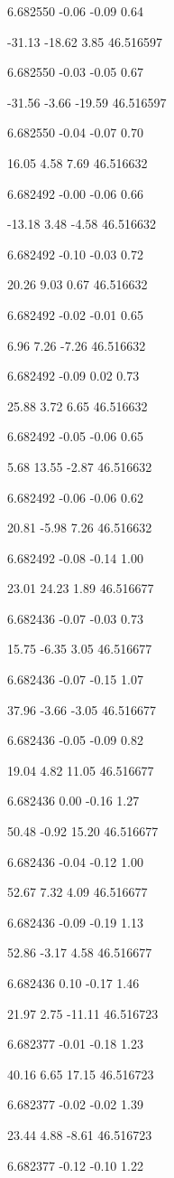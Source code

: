 6.682550
-0.06
-0.09
0.64

-31.13
-18.62
3.85
46.516597

6.682550
-0.03
-0.05
0.67

-31.56
-3.66
-19.59
46.516597

6.682550
-0.04
-0.07
0.70

16.05
4.58
7.69
46.516632

6.682492
-0.00
-0.06
0.66

-13.18
3.48
-4.58
46.516632

6.682492
-0.10
-0.03
0.72

20.26
9.03
0.67
46.516632

6.682492
-0.02
-0.01
0.65

6.96
7.26
-7.26
46.516632

6.682492
-0.09
0.02
0.73

25.88
3.72
6.65
46.516632

6.682492
-0.05
-0.06
0.65

5.68
13.55
-2.87
46.516632

6.682492
-0.06
-0.06
0.62

20.81
-5.98
7.26
46.516632

6.682492
-0.08
-0.14
1.00

23.01
24.23
1.89
46.516677

6.682436
-0.07
-0.03
0.73

15.75
-6.35
3.05
46.516677

6.682436
-0.07
-0.15
1.07

37.96
-3.66
-3.05
46.516677

6.682436
-0.05
-0.09
0.82

19.04
4.82
11.05
46.516677

6.682436
0.00
-0.16
1.27

50.48
-0.92
15.20
46.516677

6.682436
-0.04
-0.12
1.00

52.67
7.32
4.09
46.516677

6.682436
-0.09
-0.19
1.13

52.86
-3.17
4.58
46.516677

6.682436
0.10
-0.17
1.46

21.97
2.75
-11.11
46.516723

6.682377
-0.01
-0.18
1.23

40.16
6.65
17.15
46.516723

6.682377
-0.02
-0.02
1.39

23.44
4.88
-8.61
46.516723

6.682377
-0.12
-0.10
1.22

